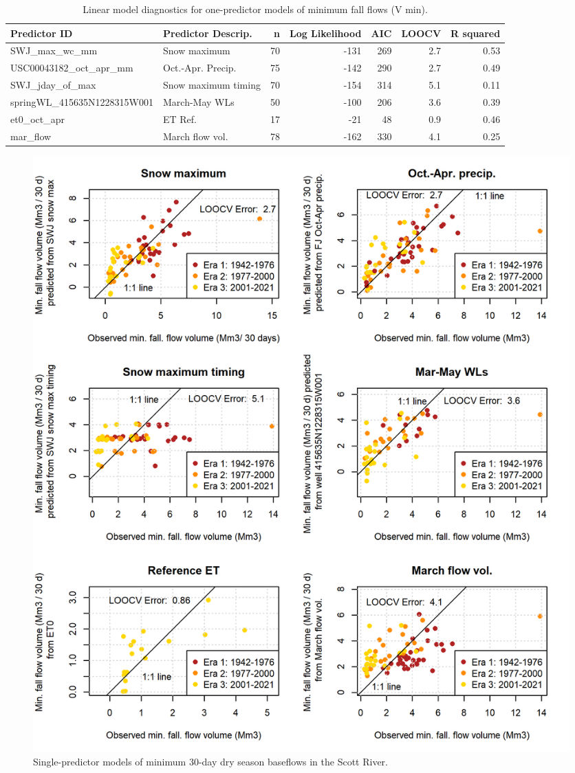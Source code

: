 \documentclass[hess, manuscript]{copernicus}
\begin{document}
\begin{table}[ht]
\centering
\caption{Linear model diagnostics for one-predictor models of minimum fall flows (V min).} 
\label{tab:vmin_tab_1pred}
\begin{tabular}{llrrrrr}
  \hline
Predictor ID & Predictor Descrip. & n & Log Likelihood & AIC & LOOCV & R squared \\ 
  \hline
SWJ\_max\_wc\_mm & Snow maximum & 70 & -131 & 269 & 2.7 & 0.53 \\ 
  USC00043182\_oct\_apr\_mm & Oct.-Apr. Precip. & 75 & -142 & 290 & 2.7 & 0.49 \\ 
  SWJ\_jday\_of\_max & Snow maximum timing & 70 & -154 & 314 & 5.1 & 0.11 \\ 
  springWL\_415635N1228315W001 & March-May WLs & 50 & -100 & 206 & 3.6 & 0.39 \\ 
  et0\_oct\_apr & ET Ref. & 17 & -21 & 48 & 0.9 & 0.46 \\ 
  mar\_flow & March flow vol. & 78 & -162 & 330 & 4.1 & 0.25 \\ 
   \hline
\end{tabular}
\end{table}

\begin{figure}
\includegraphics[width=1\linewidth]{f11} \caption{\label{fig:one_predictor_model} Single-predictor models of minimum 30-day dry season baseflows in the Scott River.}\label{fig:one_predictor_model}
\end{figure}
\end{document}
